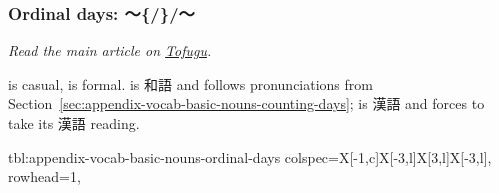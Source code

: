 \documentclass[../nihongo-gakushuu-kyouzai.tex]{subfiles}
\begin{document}
\subsubsection{Ordinal days: 〜\{/\}/〜} \label{sec:appendix-vocab-basic-nouns-ordinal-days}
\emph{Read the main article on \href{https://www.tofugu.com/japanese/japanese-counter-ka-nichi/}{Tofugu}.}

 is casual,  is formal.  is 和語 and follows pronunciations from Section~\ref{sec:appendix-vocab-basic-nouns-counting-days};  is 漢語 and forces  to take its 漢語 reading.

{tbl:appendix-vocab-basic-nouns-ordinal-days}  %
{
    colspec={X[-1,c]X[-3,l]X[3,l]X[-3,l]},
    rowhead=1,
}  %
\end{document}
